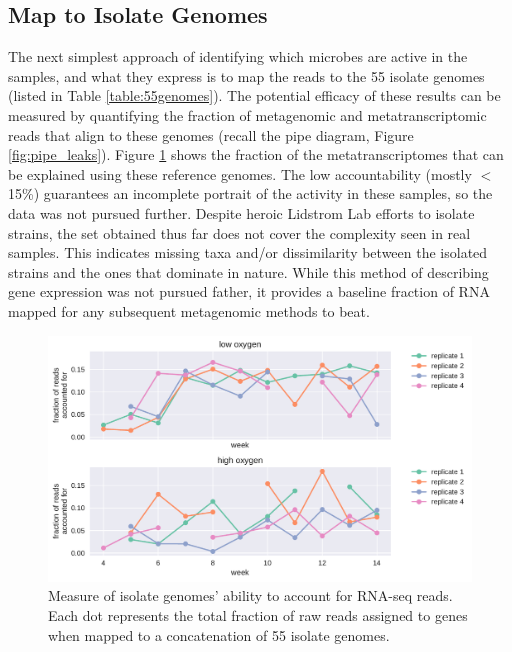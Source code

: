 \subsection{Map to Isolate Genomes}

The next simplest approach of identifying which microbes are active in the samples, and what they express is to map the reads to the 55 isolate genomes (listed in Table \ref{table:55genomes}).
The potential efficacy of these results can be measured by quantifying the fraction of metagenomic and metatranscriptomic reads that align to these genomes (recall the pipe diagram, Figure \ref{fig:pipe_leaks}).
Figure \ref{fig:isolate_RNAseq} shows the fraction of the metatranscriptomes that can be explained using these reference genomes.
The low accountability (mostly $<$15\%) guarantees an incomplete portrait of the activity in these samples, so the data was not pursued further.
Despite heroic Lidstrom Lab efforts to isolate strains, the set obtained thus far does not cover the complexity seen in real samples.
This indicates missing taxa and/or dissimilarity between the isolated strains and the ones that dominate in nature.
While this method of describing gene expression was not pursued father, it provides a baseline fraction of RNA mapped for any subsequent metagenomic methods to beat.


\begin{figure}[H]
\centering
    \includegraphics[width=1.0\textwidth]{./tex/chapter2/figures/170208_fraction_of_transcriptome_reads_mapped_to_isolates.pdf}
    \begin{singlespace}
    \caption[Measure of isolate genomes' ability to account for RNA-seq reads]{
        Measure of isolate genomes' ability to account for RNA-seq reads.
        Each dot represents the total fraction of raw reads assigned to genes when mapped to a concatenation of 55 isolate genomes.
        }
    \label{fig:isolate_RNAseq}
    \end{singlespace}
\end{figure}

